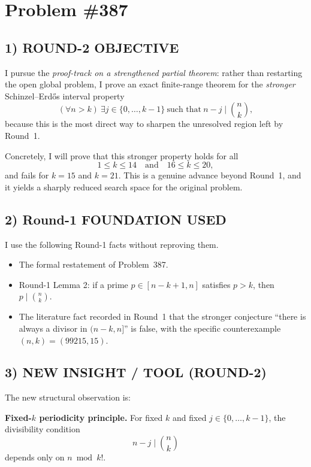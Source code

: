 \section*{Problem \#387}

\subsection*{1) ROUND-2 OBJECTIVE}

I pursue the \emph{proof-track on a strengthened partial theorem}: rather than restarting the open global problem, I prove an exact finite-range theorem for the \emph{stronger} Schinzel--Erd\H{o}s interval property
\[
(\forall n>k)\ \exists j\in\{0,\dots,k-1\}\ \mbox{such that}\ n-j\mid \binom{n}{k},
\]
because this is the most direct way to sharpen the unresolved region left by Round~1.

Concretely, I will prove that this stronger property holds for all
\[
1\le k\le 14 \quad\mbox{and}\quad 16\le k\le 20,
\]
and fails for \(k=15\) and \(k=21\).  This is a genuine advance beyond Round~1, and it yields a sharply reduced search space for the original problem.

\subsection*{2) Round-1 FOUNDATION USED}

I use the following Round-1 facts without reproving them.

\begin{itemize}
\item The formal restatement of Problem~387.
\item Round-1 Lemma 2: if a prime \(p\in [n-k+1,n]\) satisfies \(p>k\), then \(p\mid \binom{n}{k}\).
\item The literature fact recorded in Round~1 that the stronger conjecture ``there is always a divisor in \((n-k,n]\)'' is false, with the specific counterexample \((n,k)=(99215,15)\).
\end{itemize}

\subsection*{3) NEW INSIGHT / TOOL (ROUND-2)}

The new structural observation is:

\medskip
\noindent
\textbf{Fixed-\(k\) periodicity principle.}
For fixed \(k\) and fixed \(j\in\{0,\dots,k-1\}\), the divisibility condition
\[
n-j\mid \binom{n}{k}
\]
depends only on \(n\bmod k!\).

